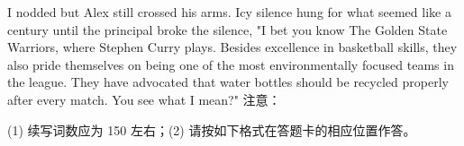 \documentclass{英语试卷}
\begin{document}
\par I nodded but Alex still crossed his arms. Icy silence hung for what seemed like a century until the principal broke the silence, "I bet you know The Golden State Warriors, where Stephen Curry plays. Besides excellence in basketball skills, they also pride themselves on being one of the most environmentally focused teams in the league. They have advocated that water bottles should be recycled properly after every match. You see what I mean?" 注意：\par
\par (1) 续写词数应为 150 左右；(2) 请按如下格式在答题卡的相应位置作答。\par
{}
\end{document}
